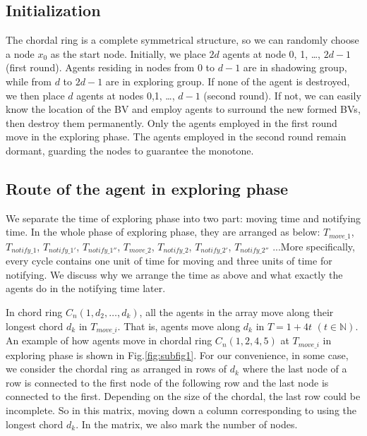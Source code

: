 \documentclass[conference]{IEEEtran}
\begin{document}
\subsection{Initialization }
The chordal ring is a complete symmetrical structure, so we can randomly choose a node $x_0$ as the start node. Initially, we place $2d$ agents at node 0, 1, \ldots , $2d-1$ (first round). Agents residing in nodes from $0$ to $d-1$ are in shadowing group, while from $d$ to $2d-1$ are in exploring group. If none of the agent is destroyed, we then place $d$ agents at nodes 0,1, \ldots, $d-1$ (second round). If not, we can easily know the location of the BV and employ agents to surround the new formed BVs, then destroy them permanently. Only the agents employed in the first round move in the exploring phase. The agents employed in the second round remain dormant, guarding the nodes to guarantee the monotone. \\

\subsection{Route of the agent in exploring phase}
We separate the time of exploring phase into two part: moving time and notifying time. In the whole phase of exploring phase, they are arranged as below: $T_{move\_1}$, $T_{notify\_1}$, $T_{notify\_1'}$, $T_{notify\_1''}$, $T_{move\_2}$, $T_{notify\_2}$, $T_{notify\_2'}$, $T_{notify\_2''}$ ...More specifically, every cycle contains one unit of time for moving and three units of time for notifying. We discuss why we arrange the time as above and what exactly the agents do in the notifying time later. 

In chord ring $C_n(1, d_2, \ldots, d_k)$, all the agents in the array move along their longest chord $d_k$ in $T_{move\_i}$. That is, agents move along $d_k$ in $T=1+4t$ $(t\in \mathbb{N})$.  An example of how agents move in chordal ring $C_n(1, 2 , 4, 5)$ at $T_{move\_i}$ in exploring phase is shown in Fig.\ref{fig:subfig1}. For our convenience, in some case, we consider the chordal ring as arranged in rows of $d_k$ where the last node of a row is connected to the first node of the following row and the last node is connected to the first. Depending on the size of the chordal, the last row could be incomplete. So in this matrix, moving down a column corresponding to using the longest chord $d_k$. In the matrix, we also mark the number of nodes.\\
\end{document}
